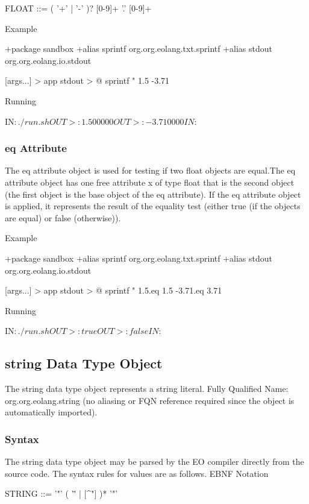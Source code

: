 \documentclass[12pt]{book}
\begin{document}
\begin{ffcode}
FLOAT    ::= ( '+' | '-' )? [0-9]+ '.' [0-9]+
\end{ffcode}

Example
\begin{ffcode}
+package sandbox
+alias sprintf org.org.eolang.txt.sprintf
+alias stdout org.org.eolang.io.stdout

[args...] > app
  stdout > @
    sprintf
      "%
      1.5
      -3.71

Running

IN$: ./run.sh
OUT>: 1.500000
OUT>: -3.710000
IN$: 
\end{ffcode}

\subsubsection{eq Attribute}
The eq attribute object is used for testing if two float objects are equal.The eq attribute object has one free attribute x of type float that is the second object (the first object is the base object of the eq attribute).
If the eq attribute object is applied, it represents the result of the equality test (either true (if the objects are equal) or false (otherwise)).

Example
\begin{ffcode}
+package sandbox
+alias sprintf org.org.eolang.txt.sprintf
+alias stdout org.org.eolang.io.stdout

[args...] > app
  stdout > @
    sprintf
      "%
      1.5.eq 1.5
      -3.71.eq 3.71

Running

IN$: ./run.sh
OUT>: true
OUT>: false
IN$: 
\end{ffcode}

\subsection{string Data Type Object}
The string data type object represents a string literal.
Fully Qualified Name: org.org.eolang.string (no aliasing or FQN reference required since the object is automatically imported).

\subsubsection{Syntax}
The string data type object may be parsed by the EO compiler directly from the source code. The syntax rules for values are as follows.
EBNF Notation
\begin{ffcode}

STRING   ::= '"' ( '\"' | [^"] )* '"'
\end{ffcode}
\end{document}
